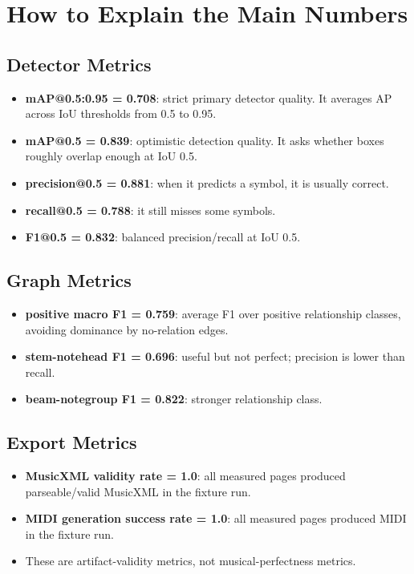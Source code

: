 \documentclass[11pt]{article}
\newcommand{\metric}[1]{\textbf{#1}}
\begin{document}
\section{How to Explain the Main Numbers}

\subsection{Detector Metrics}

\begin{itemize}
  \item \metric{mAP@0.5:0.95 = 0.708}: strict primary detector quality. It averages AP across IoU thresholds from 0.5 to 0.95.
  \item \metric{mAP@0.5 = 0.839}: optimistic detection quality. It asks whether boxes roughly overlap enough at IoU 0.5.
  \item \metric{precision@0.5 = 0.881}: when it predicts a symbol, it is usually correct.
  \item \metric{recall@0.5 = 0.788}: it still misses some symbols.
  \item \metric{F1@0.5 = 0.832}: balanced precision/recall at IoU 0.5.
\end{itemize}

\subsection{Graph Metrics}

\begin{itemize}
  \item \metric{positive macro F1 = 0.759}: average F1 over positive relationship classes, avoiding dominance by no-relation edges.
  \item \metric{stem-notehead F1 = 0.696}: useful but not perfect; precision is lower than recall.
  \item \metric{beam-notegroup F1 = 0.822}: stronger relationship class.
\end{itemize}

\subsection{Export Metrics}

\begin{itemize}
  \item \metric{MusicXML validity rate = 1.0}: all measured pages produced parseable/valid MusicXML in the fixture run.
  \item \metric{MIDI generation success rate = 1.0}: all measured pages produced MIDI in the fixture run.
  \item These are artifact-validity metrics, not musical-perfectness metrics.
\end{itemize}
\end{document}
